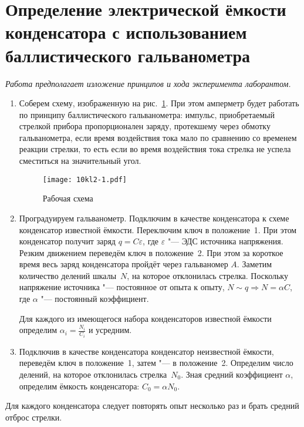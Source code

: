 \section[Определение ёмкости конденсатора]{Определение электрической ёмкости конденсатора с использованием баллистического гальванометра}
{\itshape Работа предполагает изложение принципов и хода эксперимента лаборантом.}
\SolveVariant
\begin{enumerate}
    \item Соберем схему, изображенную на рис.~\ref{fig:10kl-bg:scheme}. При этом амперметр будет работать по принципу баллистического гальванометра: импульс, приобретаемый стрелкой прибора пропорционален заряду, протекшему через обмотку гальванометра, если время воздействия тока мало по сравнению со временем реакции стрелки, то есть если во время воздействия тока стрелка не успела сместиться на значительный угол.
    \begin{figure}[h]
	    \centering
		\texttt{[image: 10kl2-1.pdf]}
		\caption{Рабочая схема}
		\label{fig:10kl-bg:scheme}
	\end{figure}
    \item Проградуируем гальванометр. Подключим в качестве конденсатора к схеме конденсатор известной ёмкости. Переключим ключ в положение~1. При этом конденсатор получит заряд \(q= C \varepsilon\), где \(\varepsilon\) "--- ЭДС источника напряжения. Резким движением переведём ключ в положение~2. При этом за короткое время весь заряд конденсатора пройдёт через гальваномер \(A\). Заметим количество делений шкалы~\(N\), на которое отклонилась стрелка. Поскольку напряжение источника "--- постоянное от опыта к опыту, \(N\sim q \Rightarrow N=\alpha C\), где \(\alpha\) "--- постоянный коэффициент.\par
    Для каждого из имеющегося набора конденсаторов известной ёмкости определим \(\alpha_i = \frac{N_i}{C_i}\) и усредним.
    \item Подключив в качестве конденсатора конденсатор неизвестной ёмкости, переведём ключ в положение~1, затем "--- в положение~2. Определим число делений, на которое отклонилась стрелка~\(N_0\). Зная средний коэффициент \(\alpha\), определим ёмкость конденсатора: \(C_0=\alpha N_0\).
\end{enumerate}
Для каждого конденсатора следует повторять опыт несколько раз и брать средний отброс стрелки.
